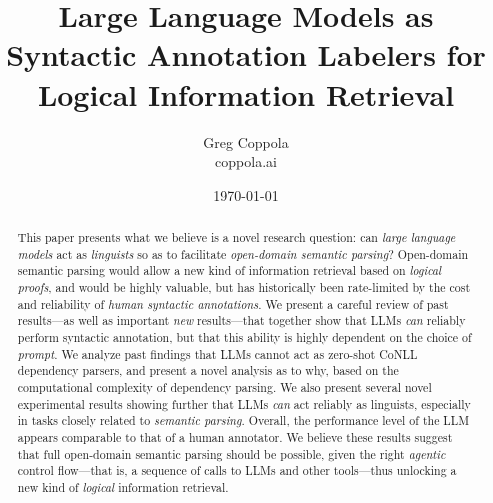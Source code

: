 \documentclass[11pt]{article}
\title{Large Language Models as Syntactic Annotation Labelers for Logical Information Retrieval}
\author{Greg Coppola\\coppola.ai}
\date{\today}
\begin{document}
\maketitle

\begin{abstract}
This paper presents what we believe is a novel research question: can \emph{large language models} act as \emph{linguists} so as to facilitate \emph{open-domain semantic parsing}?
Open-domain semantic parsing would allow a new kind of information retrieval based on \emph{logical proofs}, and would be highly valuable, but has historically been rate-limited by the cost and reliability of \emph{human syntactic annotations}.
We present a careful review of past results---as well as important \emph{new} results---that together show that LLMs \emph{can} reliably perform syntactic annotation, but that this ability is highly dependent on the choice of \emph{prompt}.
We analyze past findings that LLMs cannot act as zero-shot CoNLL dependency parsers, and present a novel analysis as to why, based on the computational complexity of dependency parsing.
We also present several novel experimental results showing further that LLMs \emph{can} act reliably as linguists, especially in tasks closely related to \emph{semantic parsing}.
Overall, the performance level of the LLM appears comparable to that of a human annotator.
We believe these results suggest that full open-domain semantic parsing should be possible, given the right \emph{agentic} control flow---that is, a sequence of calls to LLMs and other tools---thus unlocking a new kind of \emph{logical} information retrieval.
\end{abstract}
\end{document}

